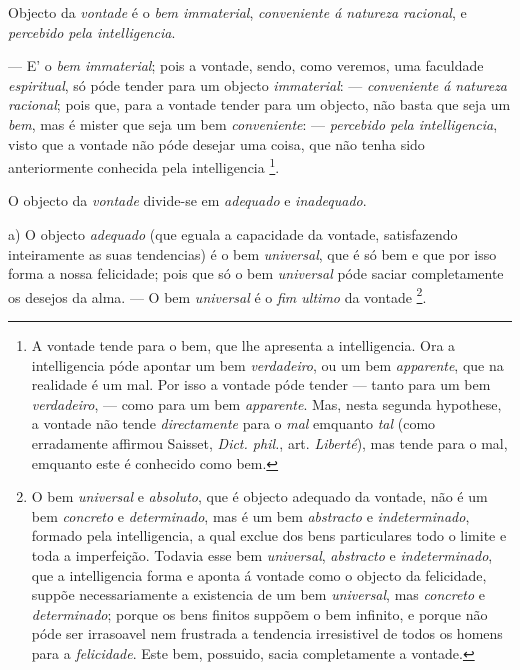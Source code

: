 
Objecto da \emph{vontade} é o \emph{bem immaterial}, \emph{conveniente á natureza racional}, e \emph{percebido pela intelligencia}.

--- E' o \emph{bem immaterial}; pois a vontade, sendo, como veremos, uma faculdade \emph{espiritual}, só póde tender para um   objecto \emph{immaterial}: --- \emph{conveniente á natureza racional}; pois que, para a vontade tender para um objecto, não basta que seja um \emph{bem}, mas é mister que seja um bem \emph{conveniente}: --- \emph{percebido pela intelligencia}, visto que a vontade não póde desejar uma coisa, que não tenha sido anteriormente conhecida pela intelligencia \footnote{A vontade tende para o bem, que lhe apresenta a intelligencia. Ora a intelligencia póde apontar um bem \emph{verdadeiro}, ou um bem \emph{apparente}, que na realidade é um mal. Por isso a vontade póde tender --- tanto para um bem \emph{verdadeiro}, --- como para um bem \emph{apparente}. Mas, nesta segunda hypothese, a vontade não tende \emph{directamente} para o \emph{mal} emquanto \emph{tal} (como erradamente affirmou Saisset, \emph{Dict. phil.}, art. \emph{Liberté}), mas tende para o mal, emquanto este é conhecido como bem.}.


O objecto da \emph{vontade} divide-se em \emph{adequado} e \emph{inadequado}.

a) O objecto \emph{adequado} (que eguala a capacidade da vontade, satisfazendo inteiramente as suas tendencias) é o bem \emph{universal}, que é só bem e que por isso forma a nossa felicidade; pois que só o bem \emph{universal} póde saciar completamente os desejos da alma. --- O bem \emph{universal} é o \emph{fim ultimo} da vontade \footnote{O bem \emph{universal} e \emph{absoluto}, que é objecto adequado da vontade, não é um bem \emph{concreto} e \emph{determinado}, mas é um bem \emph{abstracto} e \emph{indeterminado}, formado pela intelligencia, a qual exclue dos bens particulares todo o limite e toda a imperfeição. Todavia esse bem \emph{universal}, \emph{abstracto} e \emph{indeterminado}, que a intelligencia forma e aponta á vontade como o objecto da felicidade, suppõe necessariamente a existencia de um bem \emph{universal}, mas \emph{concreto} e \emph{determinado}; porque os bens finitos suppõem o bem infinito, e porque não póde ser irrasoavel nem frustrada a tendencia irresistivel de todos os homens para a \emph{felicidade}. Este bem, possuido, sacia completamente a vontade.}.

